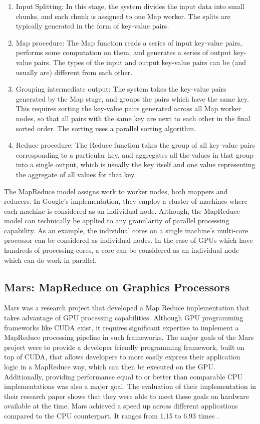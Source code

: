 \documentclass{article}
\begin{document}
 \begin{enumerate}
     \item Input Splitting: In this stage, the system divides the input data into small chunks, and each chunk is assigned to one Map worker. The splits are typically generated in the form of key-value pairs.
     \item Map procedure: The Map function reads a series of input key-value pairs, performs some computation on them, and generates a series of output key-value pairs. The types of the input and output key-value pairs can be (and usually are) different from each other.
     \item Grouping intermediate output: The system takes the key-value pairs generated by the Map stage, and groups the pairs which have the same key. This requires sorting the key-value pairs generated across all Map worker nodes, so that all pairs with the same key are next to each other in the final sorted order. The sorting uses a parallel sorting algorithm.
     \item Reduce procedure: The Reduce function takes the group of all key-value pairs corresponding to a particular key, and aggregates all the values in that group into a single output, which is usually the key itself and one value representing the aggregate of all values for that key.
 \end{enumerate}

The MapReduce model assigns work to worker nodes, both mappers and reducers. In Google's implementation, they employ a cluster of machines where each machine is considered as an individual node. Although, the MapReduce model can technically be applied to any granularity of parallel processing capability. As an example, the individual cores on a single machine's multi-core processor can be considered as individual nodes. In the case of GPUs which have hundreds of processing cores, a core can be considered as an individual node which can do work in parallel.

\subsection{Mars: MapReduce on Graphics Processors}
Mars was a research project that developed a Map Reduce implementation that takes advantage of GPU processing capabilities. Although GPU programming frameworks like CUDA \cite{cuda_docs} exist, it requires significant expertise to implement a MapReduce processing pipeline in such frameworks. The major goals of the Mars project were to provide a developer friendly programming framework, built on top of CUDA, that allows developers to more easily express their application logic in a MapReduce way, which can then be executed on the GPU. Additionally, providing performance equal to or better than comparable CPU implementations was also a major goal. The evaluation of their implementation in their research paper shows that they were able to meet these goals on hardware available at the time. Mars achieved a speed up across different applications compared to the CPU counterpart. It ranges from 1.15 to 6.93 times \cite{mars}.
\end{document}
